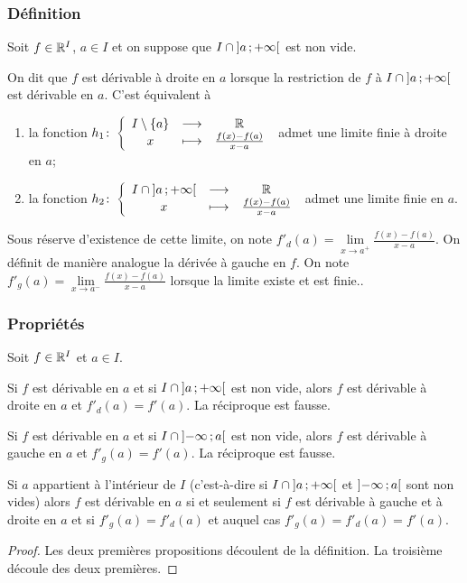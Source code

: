\subsubsection{Définition}
Soit \(f \in \mathbb{R}^I\), \(a \in I\) et on suppose que \(I \cap 
\left] a \, ;  +\infty \right[\) est non vide.
\begin{defdef}
  On dit que \(f\) est dérivable à droite en \(a\) lorsque la restriction de 
  \(f\) à \(I \cap \left] a \, ;  +\infty \right[\) est dérivable en \(a\). C'est 
  équivalent à
  \begin{enumerate}
    \item la fonction 
      \(h_1\colon \left\{\begin{array}{ccc} I\setminus\{a\} & \longrightarrow &\mathbb{R}\\ x & \longmapsto & \frac{f(x)-f(a)}{x-a} \end{array} \right.\) admet 
      une limite finie à droite en \(a\);
    \item la fonction \(h_2\colon \left\{\begin{array}{ccc} I \cap 
      \left] a \, ;  +\infty \right[ & \longrightarrow &\mathbb{R}\\ x & \longmapsto & \frac{f(x)-f(a)}{x-a} \end{array} \right.\) admet une 
      limite finie en \(a\).
  \end{enumerate}
  Sous réserve d'existence de cette limite, on note \(f'_d(a) = \lim\limits_{x 
  \to a^+}\frac{f(x)-f(a)}{x-a}\). On définit de manière analogue la dérivée à 
  gauche en \(f\). On note \(f'_g(a) = \lim\limits_{x \to 
  a^-}\frac{f(x)-f(a)}{x-a}\) lorsque la limite existe et est finie..
\end{defdef}

\subsubsection{Propriétés}

Soit \(f \in \mathbb{R}^I\) et \(a \in I\).
\begin{prop}
  Si \(f\) est dérivable en \(a\) et si \(I\cap \left] a \, ;  +\infty \right[\) est 
  non vide, alors \(f\) est dérivable à droite en \(a\) et \(f'_d(a)=f'(a)\). La 
  réciproque est fausse.
\end{prop}
\begin{prop}
  Si \(f\) est dérivable en \(a\) et si \(I\cap \left] -\infty \, ;  a \right[\) est 
  non vide, alors \(f\) est dérivable à gauche en \(a\) et \(f'_g(a)=f'(a)\). La 
  réciproque est fausse.
\end{prop}
\begin{prop}
  Si \(a\) appartient à l'intérieur de \(I\) (c'est-à-dire si \(I\cap 
  \left] a \, ;  +\infty \right[\) et \(\left] -\infty \, ;  a \right[\) sont non vides) 
  alors \(f\) est dérivable en \(a\) si et seulement si \(f\) est dérivable à 
  gauche et à droite en \(a\) et si \(f'_g(a) = f'_d(a)\) et auquel cas 
  \(f'_g(a)=f'_d(a)=f'(a)\).
\end{prop}
\begin{proof}
  Les deux premières propositions découlent de la définition. La troisième 
  découle des deux premières.
\end{proof}

